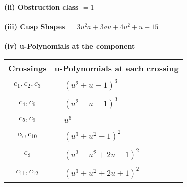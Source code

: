 \documentclass[1p]{elsarticle_modified}
\theoremstyle{definition}
\begin{document}
\flushleft \textbf{(ii) Obstruction class $= 1$}\\~\\
\flushleft \textbf{(iii) Cusp Shapes $= 3 u^2 a+3 a u+4 u^2+u-15$}\\~\\
\newpage\renewcommand{\arraystretch}{1}
\flushleft \textbf{(iv) u-Polynomials at the component}\newline \\
\begin{tabular}{m{50pt}|m{274pt}}
Crossings & \hspace{64pt}u-Polynomials at each crossing \\
\hline $$\begin{aligned}c_{1},c_{2},c_{3}\end{aligned}$$&$\begin{aligned}
&(u^2+u-1)^3
\end{aligned}$\\
\hline $$\begin{aligned}c_{4},c_{6}\end{aligned}$$&$\begin{aligned}
&(u^2- u-1)^3
\end{aligned}$\\
\hline $$\begin{aligned}c_{5},c_{9}\end{aligned}$$&$\begin{aligned}
&u^6
\end{aligned}$\\
\hline $$\begin{aligned}c_{7},c_{10}\end{aligned}$$&$\begin{aligned}
&(u^3+u^2-1)^2
\end{aligned}$\\
\hline $$\begin{aligned}c_{8}\end{aligned}$$&$\begin{aligned}
&(u^3- u^2+2 u-1)^2
\end{aligned}$\\
\hline $$\begin{aligned}c_{11},c_{12}\end{aligned}$$&$\begin{aligned}
&(u^3+u^2+2 u+1)^2
\end{aligned}$\\
\hline
\end{tabular}\\~\\
\end{document}
